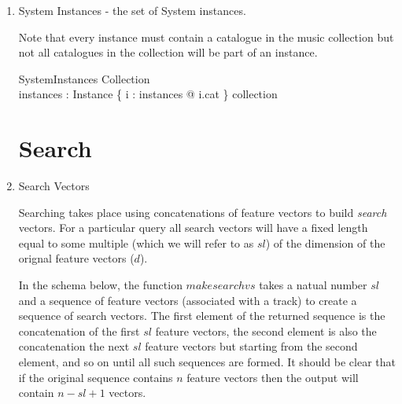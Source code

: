 \documentclass[11pt]{article}
\begin{document}
\begin{enumerate}
\item  \textsf{System Instances}  - the set of System instances.

Note that every instance must contain a catalogue in the music collection but not all catalogues in the collection will be part of an instance. 

\begin{schema}{SystemInstances}
		Collection \\
		instances : \power Instance
\where
		\{ i : instances @ i.cat \} \subseteq collection
\end{schema}
		
\section{Search}

\item \textsf{Search Vectors}

Searching takes place using concatenations of feature vectors to build \emph{search} vectors. For a particular query all search vectors will have a fixed length equal to some multiple (which we will refer to as $sl$) of the dimension of the orignal feature vectors ($d$). 

In the schema below, the function $makesearchvs$ takes a natual number $sl$ and a sequence of feature vectors (associated with a track) to create a sequence of search vectors. The first element of the returned sequence is the concatenation of the first $sl$ feature vectors, the second element is also the concatenation the next $sl$ feature vectors but starting from the second element, and so on until all such sequences are formed.  It should be clear that if the original sequence contains $n$ feature vectors then the output will contain $n-sl+1$ vectors. 


\end{enumerate}
\end{document}
